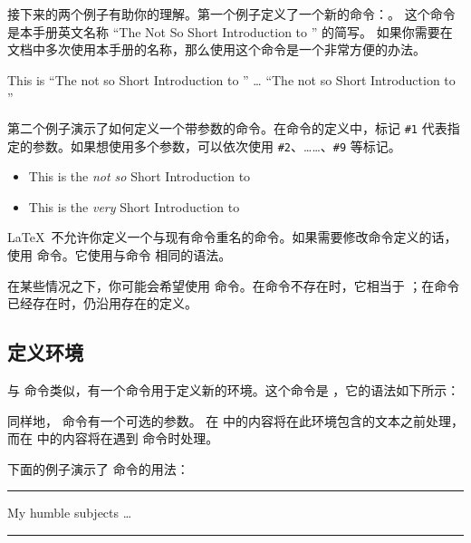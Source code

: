 接下来的两个例子有助你的理解。第一个例子定义了一个新的命令：。
这个命令是本手册英文名称 ``The Not So Short Introduction to \LaTeXe'' 的简写。
如果你需要在文档中多次使用本手册的名称，那么使用这个命令是一个非常方便的办法。

\begin{example}
\newcommand{\tnss}{The not
    so Short Introduction to
    \LaTeXe}
This is ``\tnss'' \ldots{}
``\tnss''
\end{example}

第二个例子演示了如何定义一个带参数的命令。在命令的定义中，标记 \verb|#1| 
代表指定的参数。如果想使用多个参数，可以依次使用 \verb|#2|、……、\verb|#9| 等标记。

\begin{example}
\newcommand{\txsit}[1]
 {This is the \emph{#1} Short
      Introduction to \LaTeXe}
\begin{itemize}
\item \txsit{not so}
\item \txsit{very}
\end{itemize}
\end{example}

\LaTeX\ 不允许你定义一个与现有命令重名的命令。如果需要修改命令定义的话，使用  命令。它使用与命令 
相同的语法。

在某些情况之下，你可能会希望使用  命令。在命令不存在时，它相当于  
；在命令已经存在时，仍沿用存在的定义。

\subsection{定义环境}\label{subsec:newenv}

与  命令类似，有一个命令用于定义新的环境。这个命令是 ，它的语法如下所示：

\begin{command}
\end{command}

同样地， 命令有一个可选的参数。
在  中的内容将在此环境包含的文本之前处理，而在  中的内容将在遇到  命令时处理。

下面的例子演示了  命令的用法：
\begin{example}
\newenvironment{king}
{\rule{1ex}{1ex}%
     \hspace{\stretch{1}}}
{%
     \rule{1ex}{1ex}}

\begin{king}
My humble subjects \ldots
\end{king}
\end{example}

